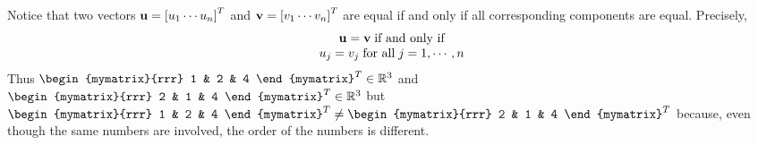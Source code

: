 Notice that two vectors ${\bf u} = \left[u_{1} \cdots u_{n}\right]^T $ and
${\bf v}=\left[v_{1} \cdots v_{n}\right]^T$ are equal if and only if
all corresponding components are equal. Precisely,
\begin{equation*}
\begin{array}{c}
{\bf u}={\bf v} \; \mbox{if and only if}\\
u_{j}=v_{j} \; \mbox{for all}\; j=1,\cdots ,n
\end{array}
\end{equation*} 
Thus 
$\begin{mymatrix}{rrr}
1  & 2 & 4
\end{mymatrix}^T \in \R^{3}$ and $\begin{mymatrix}{rrr}
2 & 1 & 4
\end{mymatrix}^T \in
\R^{3}$ but $\begin{mymatrix}{rrr}
1 & 2 & 4
\end{mymatrix}^T \neq \begin{mymatrix}{rrr}
2 & 1 & 4
\end{mymatrix}^T $ because,
even though the same numbers are involved, the order of the numbers is different. 
